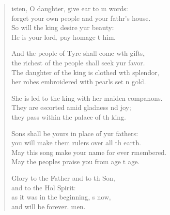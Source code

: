 \begin{verse}
  \begin{patverse}
isten, O daughter, give ear to m words:\Med\\
forget your own people and your fathr’s house.\\
So will the king desire yur beauty:\Med\\
He is your lord, pay homage t him.

And the people of Tyre shall come w\pointup{\i}th gifts,\Med\\
the richest of the people shall seek yur favor.\\
The daughter of the king is clothed w\pointup{\i}th splendor,\Med\\
her robes embroidered with pearls set \pointup{\i}n gold.

She is led to the king with her maiden compan\pointup{\i}ons.\Flex\\
They are escorted amid gladness nd joy;\Med\\
they pass within the palace of th king.

Sons shall be yours in place of yur fathers:\Med\\
you will make them rulers over all th earth.\\
May this song make your name for ever rmembered.\Med\\
May the peoples praise you from age t age.

Glory to the Father and to th Son,\Med\\
and to the Hol Spirit:\\
as it was in the beginning, \pointup{\i}s now,\Med\\
and will be forever. men. 
  \end{patverse}
\end{verse}
